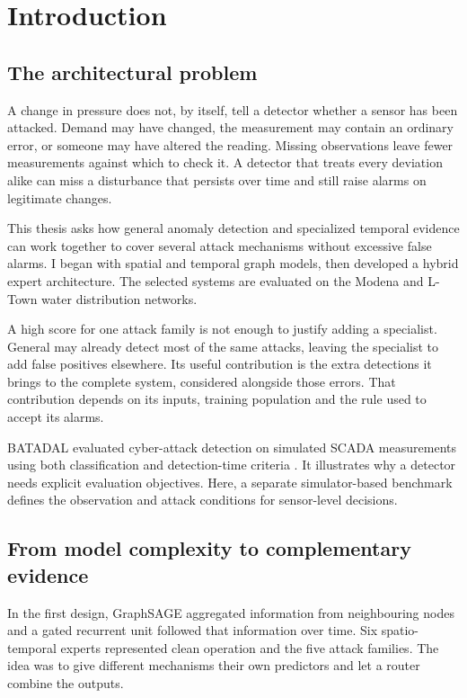 \chapter{Introduction}
\label{ch:introduction}

\section{The architectural problem}
A change in pressure does not, by itself, tell a detector whether a sensor has been attacked. Demand may have changed, the measurement may contain an ordinary error, or someone may have altered the reading. Missing observations leave fewer measurements against which to check it. A detector that treats every deviation alike can miss a disturbance that persists over time and still raise alarms on legitimate changes.

This thesis asks how general anomaly detection and specialized temporal evidence can work together to cover several attack mechanisms without excessive false alarms. I began with spatial and temporal graph models, then developed a hybrid expert architecture. The selected systems are evaluated on the Modena and L-Town water distribution networks.

A high score for one attack family is not enough to justify adding a specialist. General may already detect most of the same attacks, leaving the specialist to add false positives elsewhere. Its useful contribution is the extra detections it brings to the complete system, considered alongside those errors. That contribution depends on its inputs, training population and the rule used to accept its alarms.

BATADAL evaluated cyber-attack detection on simulated SCADA measurements using both classification and detection-time criteria \cite{batadal}. It illustrates why a detector needs explicit evaluation objectives. Here, a separate simulator-based benchmark defines the observation and attack conditions for sensor-level decisions.

\section{From model complexity to complementary evidence}
In the first design, GraphSAGE aggregated information from neighbouring nodes and a gated recurrent unit followed that information over time. Six spatio-temporal experts represented clean operation and the five attack families. The idea was to give different mechanisms their own predictors and let a router combine the outputs.

